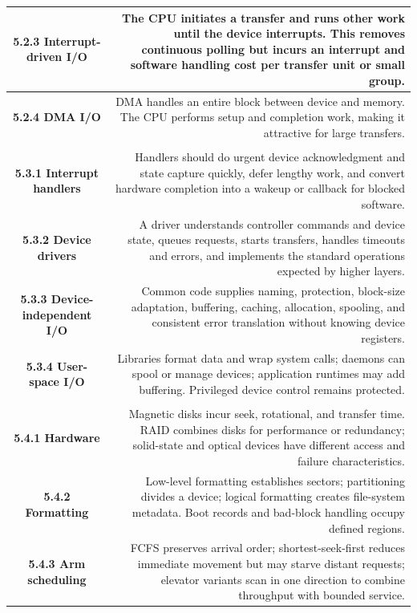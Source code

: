 \documentclass[10pt,letterpaper]{article}
\begin{document}
\begin{longtable}{C N}
\textbf{5.2.3 Interrupt-driven I/O} & The CPU initiates a transfer and runs other work until the device interrupts. This removes continuous polling but incurs an interrupt and software handling cost per transfer unit or small group.\\\hline
\textbf{5.2.4 DMA I/O} & DMA handles an entire block between device and memory. The CPU performs setup and completion work, making it attractive for large transfers.\\\hline
{}\\*\hline
\textbf{5.3.1 Interrupt handlers} & Handlers should do urgent device acknowledgment and state capture quickly, defer lengthy work, and convert hardware completion into a wakeup or callback for blocked software.\\\hline
\textbf{5.3.2 Device drivers} & A driver understands controller commands and device state, queues requests, starts transfers, handles timeouts and errors, and implements the standard operations expected by higher layers.\\\hline
\textbf{5.3.3 Device-independent I/O} & Common code supplies naming, protection, block-size adaptation, buffering, caching, allocation, spooling, and consistent error translation without knowing device registers.\\\hline
\textbf{5.3.4 User-space I/O} & Libraries format data and wrap system calls; daemons can spool or manage devices; application runtimes may add buffering. Privileged device control remains protected.\\\hline
{}\\*\hline
\textbf{5.4.1 Hardware} & Magnetic disks incur seek, rotational, and transfer time. RAID combines disks for performance or redundancy; solid-state and optical devices have different access and failure characteristics.\\\hline
\textbf{5.4.2 Formatting} & Low-level formatting establishes sectors; partitioning divides a device; logical formatting creates file-system metadata. Boot records and bad-block handling occupy defined regions.\\\hline
\textbf{5.4.3 Arm scheduling} & FCFS preserves arrival order; shortest-seek-first reduces immediate movement but may starve distant requests; elevator variants scan in one direction to combine throughput with bounded service.\\\hline

\end{longtable}
\end{document}
